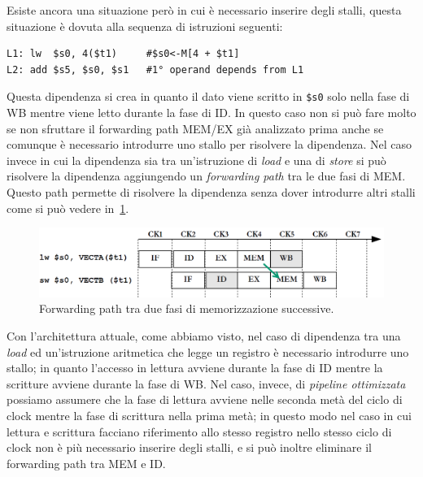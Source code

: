 Esiste ancora una situazione però in cui è necessario inserire degli stalli, questa situazione è dovuta alla sequenza di istruzioni seguenti:
\begin{verbatim}
L1: lw  $s0, 4($t1)     #$s0<-M[4 + $t1]
L2: add $s5, $s0, $s1   #1° operand depends from L1
\end{verbatim}
Questa dipendenza si crea in quanto il dato viene scritto in \texttt{\$s0} solo nella fase di WB mentre viene letto durante la fase di ID. In questo caso non si può fare molto se non sfruttare il forwarding path MEM/EX già analizzato prima anche se comunque è necessario introdurre uno stallo per risolvere la dipendenza.
Nel caso invece in cui la dipendenza sia tra un'istruzione di \emph{load} e una di \emph{store} si può risolvere la dipendenza aggiungendo un \emph{forwarding path} tra le due fasi di MEM. Questo path permette di risolvere la dipendenza senza dover introdurre altri stalli come si può vedere in \figurename\,\ref{fig:memmempath}.
\begin{figure}
\centering
\includegraphics[scale=0.5]{img/memmempath.png}
\caption{Forwarding path tra due fasi di memorizzazione successive.}\label{fig:memmempath}
\end{figure}
Con l'architettura attuale, come abbiamo visto, nel caso di dipendenza tra una \emph{load} ed un'istruzione aritmetica che legge un registro è necessario introdurre uno stallo; in quanto l'accesso in lettura avviene durante la fase di ID mentre la scritture avviene durante la fase di WB. Nel caso, invece, di \emph{pipeline ottimizzata} possiamo assumere che la fase di lettura avviene nelle seconda metà del ciclo di clock mentre la fase di scrittura nella prima metà; in questo modo nel caso in cui lettura e scrittura facciano riferimento allo stesso registro nello stesso ciclo di clock non è più necessario inserire degli stalli, e si può inoltre eliminare il forwarding path tra MEM e ID.

